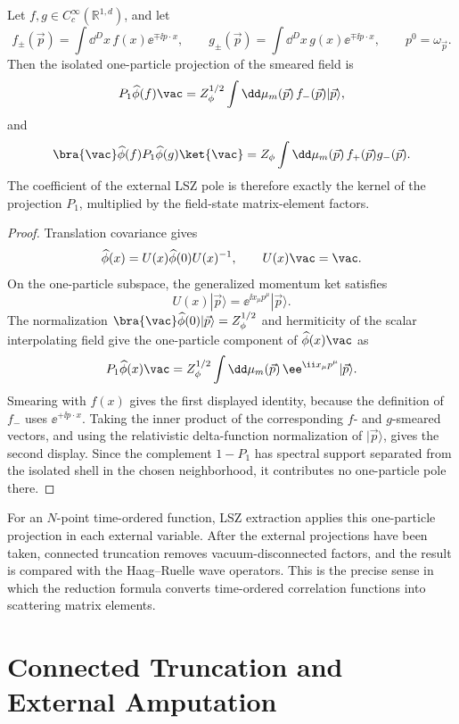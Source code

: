 \begin{lemma}
\label{lem:lsz-pole-spectral-projection}
Let \(f,g\in C_c^\infty(\mathbb R^{1,d})\), and let
\[
  f_\pm(\vec p)=\int\dd^Dx\,f(x)\ee^{\mp\ii p\cdot x},
  \qquad
  g_\pm(\vec p)=\int\dd^Dx\,g(x)\ee^{\mp\ii p\cdot x},
  \qquad p^0=\omega_{\vec p}.
\]
Then the isolated one-particle projection of the smeared field is
\[
  P_1\widehat\phi(f)\vac
  =
  Z_\phi^{1/2}
  \int\dd\mu_m(\vec p)\,f_-(\vec p)|\vec p\rangle,
\]
and
\[
  \bra{\vac}\widehat\phi(f)P_1\widehat\phi(g)\ket{\vac}
  =
  Z_\phi
  \int\dd\mu_m(\vec p)\,f_+(\vec p)g_-(\vec p).
\]
The coefficient of the external LSZ pole is therefore exactly the kernel of
the projection \(P_1\), multiplied by the field-state matrix-element factors.
\end{lemma}

\begin{proof}
Translation covariance gives
\[
  \widehat\phi(x)=U(x)\widehat\phi(0)U(x)^{-1},
  \qquad U(x)\vac=\vac .
\]
On the one-particle subspace, the generalized momentum ket satisfies
\[
  U(x)|\vec p\rangle=\ee^{\ii x_\mu p^\mu}|\vec p\rangle .
\]
The normalization
\(\bra{\vac}\widehat\phi(0)|\vec p\rangle=Z_\phi^{1/2}\) and hermiticity of
the scalar interpolating field give the one-particle component of
\(\widehat\phi(x)\vac\) as
\[
  P_1\widehat\phi(x)\vac
  =
  Z_\phi^{1/2}
  \int\dd\mu_m(\vec p)\,\ee^{\ii x_\mu p^\mu}|\vec p\rangle .
\]
Smearing with \(f(x)\) gives the first displayed identity, because the
definition of \(f_-\) uses \(\ee^{+\ii p\cdot x}\).  Taking the inner product
of the corresponding \(f\)- and \(g\)-smeared vectors, and using the
relativistic delta-function normalization of \(|\vec p\rangle\), gives the
second display.  Since the complement \(1-P_1\) has spectral support separated
from the isolated shell in the chosen neighborhood, it contributes no
one-particle pole there.
\end{proof}

For an \(N\)-point time-ordered function, LSZ extraction applies this
one-particle projection in each external variable. After the external
projections have been taken, connected truncation removes vacuum-disconnected
factors, and the result is compared with the Haag--Ruelle wave operators.
This is the precise sense in which the reduction formula converts
time-ordered correlation functions into scattering matrix elements.

\section{Connected Truncation and External Amputation}

